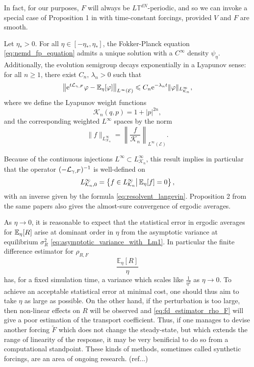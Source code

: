 In fact, for our purposes, $F$ will always be $L\mathbb{T}^{dN}$-periodic, and so we can invoke a special case of Proposition 1 in \cite{JPS15} with time-constant forcings, provided $V$ and $F$ are smooth.
\begin{theorem}\label{thm:nemd_exst_invariant_measure}
    Let $\eta_*>0$. For all $\eta\in[-\eta_*,\eta_*]$, the Fokker-Planck equation \eqref{eq:nemd_fp_equation} admits a unique solution with a $C^\infty$ density $\psi_\eta$.
    Additionally, the evolution semigroup decays exponentially in a Lyapunov sense: for all $n\geq 1$, there exist $C_n,\,\lambda_n>0$ such that
    \begin{equation}
        \label{eq:lyapunov_exp_decay}
        \left\|\mathrm{e}^{t\mathcal{L}_{\gamma,F}}\varphi-\mathbb{E}_\eta[\varphi]\right\|_{L^{\infty}(\mathcal E)}\leqslant C_n\mathrm{e}^{-\lambda_n t}\|\varphi\|_{L^\infty_{\mathcal K_n}},
    \end{equation}
    where we define the Lyapunov weight functions
    \[\mathcal K_n(q,p)=1+|p|^{2n},\]
    and the corresponding weighted $L^{\infty}$ spaces by the norm
    \[\|f\|_{L^\infty_{\mathcal K_n}}=\left\|\frac{f}{\mathcal K_n}\right\|_{L^\infty(\mathcal E)}.\]
\end{theorem}
Because of the continuous injections $L^\infty \subset L^\infty_{\mathcal K_n}$, this result implies in particular that the operator 
$(-\mathcal{L}_{\gamma,F})^{-1}$ is well-defined on 
\[L^\infty_{\mathcal K_n,0}=\left\{f\in L^\infty_{\mathcal K_n}\middle|\,\mathbb{E}_\eta[f]=0\right\},\]
with an inverse given by the formula \eqref{eq:resolvent_langevin}. Proposition 2 from the same papers also gives the almost-sure convergence of ergodic averages.
 \begin{remark}\label{rem:linear_regime}
    As $\eta \to 0$, it is reasonable to expect that the statistical error in ergodic averages for
    $\mathbb{E}_\eta[R]$ arise at dominant order in $\eta$ from the asymptotic variance at equilibrium $\sigma^2_R$ \eqref{eq:asymptotic_variance_with_Lm1}.
    In particular the finite difference estimator for $\rho_{R,F}$
    \begin{equation}
        \label{eq:fd_estimator_rho_F}
        \frac{\mathbb{E}_\eta[R]}{\eta}
    \end{equation}
    has, for a fixed simulation time, a variance which scales like $\frac1{\eta^2}$ as $\eta\to 0$.
    To achieve an acceptable statistical error at minimal cost, one should thus aim to take $\eta$ as large as possible.
    On the other hand, if the perturbation is too large, then non-linear effects on $R$ will be observed and \eqref{eq:fd_estimator_rho_F} 
    will give a poor estimation of the transport coefficient.
    Thus, if one manages to devise another forcing $\tilde F$ which does not change the steady-state, but which extends the range of linearity of the response,
    it may be very benificial to do so from a computational standpoint. These kinds of methods, sometimes called synthetic forcings, are an area of ongoing research. (ref...)
 \end{remark}
